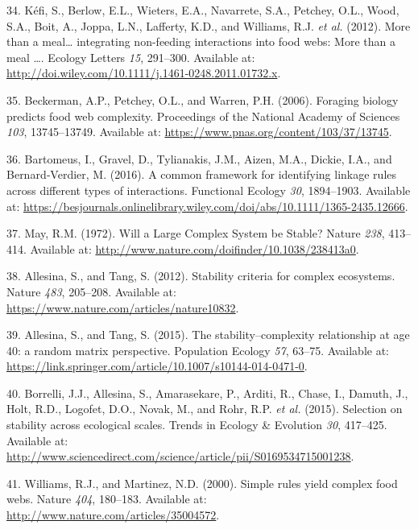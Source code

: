 \documentclass[12pt]{article}
\begin{document}
\begin{cslreferences}
\leavevmode\hypertarget{ref-KefiBerl12a}{}%
34. Kéfi, S., Berlow, E.L., Wieters, E.A., Navarrete, S.A., Petchey,
O.L., Wood, S.A., Boit, A., Joppa, L.N., Lafferty, K.D., and Williams,
R.J. \emph{et al.} (2012). More than a meal\ldots{} integrating
non-feeding interactions into food webs: More than a meal \ldots.
Ecology Letters \emph{15}, 291--300. Available at:
\url{http://doi.wiley.com/10.1111/j.1461-0248.2011.01732.x}.

\leavevmode\hypertarget{ref-BeckPetc06}{}%
35. Beckerman, A.P., Petchey, O.L., and Warren, P.H. (2006). Foraging
biology predicts food web complexity. Proceedings of the National
Academy of Sciences \emph{103}, 13745--13749. Available at:
\url{https://www.pnas.org/content/103/37/13745}.

\leavevmode\hypertarget{ref-BartGrav16}{}%
36. Bartomeus, I., Gravel, D., Tylianakis, J.M., Aizen, M.A., Dickie,
I.A., and Bernard‐Verdier, M. (2016). A common framework for identifying
linkage rules across different types of interactions. Functional Ecology
\emph{30}, 1894--1903. Available at:
\url{https://besjournals.onlinelibrary.wiley.com/doi/abs/10.1111/1365-2435.12666}.

\leavevmode\hypertarget{ref-May72}{}%
37. May, R.M. (1972). Will a Large Complex System be Stable? Nature
\emph{238}, 413--414. Available at:
\url{http://www.nature.com/doifinder/10.1038/238413a0}.

\leavevmode\hypertarget{ref-AlleTang12}{}%
38. Allesina, S., and Tang, S. (2012). Stability criteria for complex
ecosystems. Nature \emph{483}, 205--208. Available at:
\url{https://www.nature.com/articles/nature10832}.

\leavevmode\hypertarget{ref-AlleTang15}{}%
39. Allesina, S., and Tang, S. (2015). The stability--complexity
relationship at age 40: a random matrix perspective. Population Ecology
\emph{57}, 63--75. Available at:
\url{https://link.springer.com/article/10.1007/s10144-014-0471-0}.

\leavevmode\hypertarget{ref-BorrAlle15a}{}%
40. Borrelli, J.J., Allesina, S., Amarasekare, P., Arditi, R., Chase,
I., Damuth, J., Holt, R.D., Logofet, D.O., Novak, M., and Rohr, R.P.
\emph{et al.} (2015). Selection on stability across ecological scales.
Trends in Ecology \& Evolution \emph{30}, 417--425. Available at:
\url{http://www.sciencedirect.com/science/article/pii/S0169534715001238}.

\leavevmode\hypertarget{ref-WillMart00}{}%
41. Williams, R.J., and Martinez, N.D. (2000). Simple rules yield
complex food webs. Nature \emph{404}, 180--183. Available at:
\url{http://www.nature.com/articles/35004572}.


\end{cslreferences}
\end{document}
